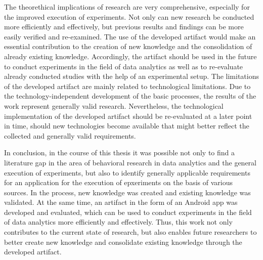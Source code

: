 The theorethical implications of research are very comprehensive, especially for the improved execution of experiments. Not only can new research be conducted more efficiently and effectively, but previous results and findings can be more easily verified and re-examined. The use of the developed artifact would make an essential contribution to the creation of new knowledge and the consolidation of already existing knowledge. Accordingly, the artifact should be used in the future to conduct experiments in the field of data analytics as well as to re-evaluate already conducted studies with the help of an experimental setup. The limitations of the developed artifact are mainly related to technological limitations. Due to the technology-independent development of the basic processes, the results of the work represent generally valid research. Nevertheless, the technological implementation of the developed artifact should be re-evaluated at a later point in time, should new technologies become available that might better reflect the collected and generally valid requirements.

In conclusion, in the course of this thesis it was possible not only to find a literature gap in the area of behavioral research in data analytics and the general execution of experiments, but also to identify generally applicable requirements for an application for the execution of epxeriments on the basis of various sources. In the process, new knowledge was created and existing knowledge was validated. At the same time, an artifact in the form of an Android app was developed and evaluated, which can be used to conduct experiments in the field of data analytics more efficiently and effectively. Thus, this work not only contributes to the current state of research, but also enables future researchers to better create new knowledge and consolidate existing knowledge through the developed artifact.